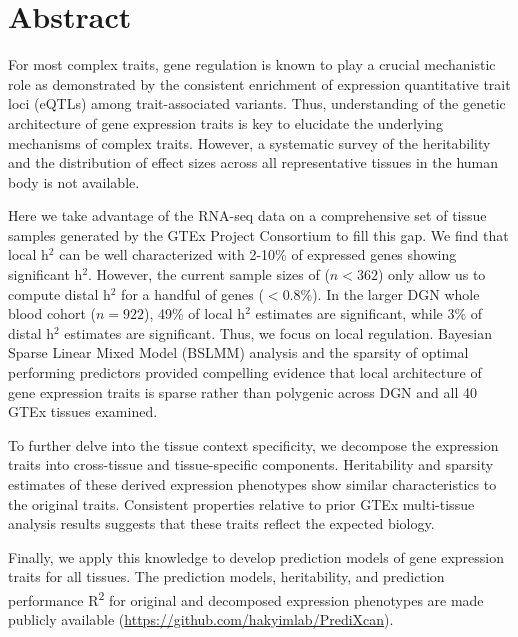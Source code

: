 \documentclass[10pt,letterpaper]{article}
\begin{document}
\section*{Abstract}
For most complex traits, gene regulation is known to play a crucial mechanistic role as demonstrated by the consistent enrichment of expression quantitative trait loci (eQTLs) among trait-associated variants. Thus, understanding of the genetic architecture of gene expression traits is key to elucidate the underlying mechanisms of complex traits. However, a systematic survey of the heritability and the distribution of effect sizes across all representative tissues in the human body is not available.

Here we take advantage of the RNA-seq data on a comprehensive set of tissue samples generated by the GTEx Project Consortium to fill this gap. We find that local h$^2$ can be well characterized with 2-10\% of expressed genes showing significant h$^2$. However, the current sample sizes of ($n<362$) only allow us to compute distal h$^2$ for a handful of genes ($<$0.8\%). In the larger DGN whole blood cohort ($n=922$), 49\% of local h$^2$ estimates are significant, while 3\% of distal h$^2$ estimates are significant. Thus, we focus on local regulation. Bayesian Sparse Linear Mixed Model (BSLMM) analysis and the sparsity of optimal performing predictors provided compelling evidence that local architecture of gene expression traits is sparse rather than polygenic across DGN and all 40 GTEx tissues examined.

To further delve into the tissue context specificity, we decompose the expression traits into cross-tissue and tissue-specific components. Heritability and sparsity estimates of these derived expression phenotypes show similar characteristics to the original traits. Consistent properties relative to prior GTEx multi-tissue analysis results suggests that these traits reflect the expected biology.

Finally, we apply this knowledge to develop prediction models of gene expression traits for all tissues. The prediction models, heritability, and prediction performance R\textsuperscript{2} for original and decomposed expression phenotypes are made publicly available (\url{https://github.com/hakyimlab/PrediXcan}).


\end{document}
